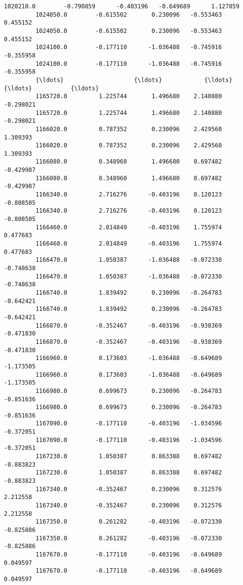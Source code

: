 \documentclass[11pt]{article}
\begin{document}
\begin{Verbatim}[commandchars=\\\{\}]
         1020210.0        -0.790859      -0.403196   -0.649689      1.127859   
         1024050.0        -0.615502       0.230096   -0.553463      0.455152   
         1024050.0        -0.615502       0.230096   -0.553463      0.455152   
         1024100.0        -0.177110      -1.036488   -0.745916     -0.355958   
         1024100.0        -0.177110      -1.036488   -0.745916     -0.355958   
         {\ldots}                    {\ldots}            {\ldots}         {\ldots}           {\ldots}   
         1165720.0         1.225744       1.496680    2.140880     -0.298021   
         1165720.0         1.225744       1.496680    2.140880     -0.298021   
         1166020.0         0.787352       0.230096    2.429560      1.309393   
         1166020.0         0.787352       0.230096    2.429560      1.309393   
         1166080.0         0.348960       1.496680    0.697482     -0.429987   
         1166080.0         0.348960       1.496680    0.697482     -0.429987   
         1166340.0         2.716276      -0.403196    0.120123     -0.808505   
         1166340.0         2.716276      -0.403196    0.120123     -0.808505   
         1166460.0         2.014849      -0.403196    1.755974      0.477683   
         1166460.0         2.014849      -0.403196    1.755974      0.477683   
         1166470.0         1.050387      -1.036488   -0.072330     -0.748638   
         1166470.0         1.050387      -1.036488   -0.072330     -0.748638   
         1166740.0         1.839492       0.230096   -0.264783     -0.642421   
         1166740.0         1.839492       0.230096   -0.264783     -0.642421   
         1166870.0        -0.352467      -0.403196   -0.938369     -0.471830   
         1166870.0        -0.352467      -0.403196   -0.938369     -0.471830   
         1166960.0         0.173603      -1.036488   -0.649689     -1.173505   
         1166960.0         0.173603      -1.036488   -0.649689     -1.173505   
         1166980.0         0.699673       0.230096   -0.264783     -0.851636   
         1166980.0         0.699673       0.230096   -0.264783     -0.851636   
         1167090.0        -0.177110      -0.403196   -1.034596     -0.372051   
         1167090.0        -0.177110      -0.403196   -1.034596     -0.372051   
         1167230.0         1.050387       0.863388    0.697482     -0.883823   
         1167230.0         1.050387       0.863388    0.697482     -0.883823   
         1167340.0        -0.352467       0.230096    0.312576      2.212558   
         1167340.0        -0.352467       0.230096    0.312576      2.212558   
         1167350.0         0.261282      -0.403196   -0.072330     -0.825886   
         1167350.0         0.261282      -0.403196   -0.072330     -0.825886   
         1167670.0        -0.177110      -0.403196   -0.649689      0.049597   
         1167670.0        -0.177110      -0.403196   -0.649689      0.049597   
         

\end{Verbatim}
\end{document}
